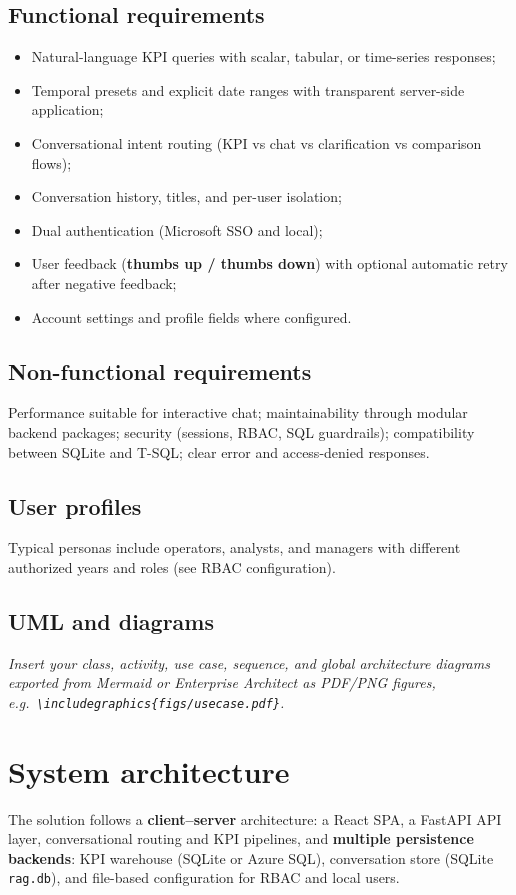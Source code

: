 \documentclass[12pt,a4paper,openany]{report}
\begin{document}
\subsection{Functional requirements}
\begin{itemize}[leftmargin=*]
  \item Natural-language KPI queries with scalar, tabular, or time-series responses;
  \item Temporal presets and explicit date ranges with transparent server-side application;
  \item Conversational intent routing (KPI vs chat vs clarification vs comparison flows);
  \item Conversation history, titles, and per-user isolation;
  \item Dual authentication (Microsoft SSO and local);
  \item User feedback (\textbf{thumbs up / thumbs down}) with optional automatic retry after negative feedback;
  \item Account settings and profile fields where configured.
\end{itemize}

\subsection{Non-functional requirements}
Performance suitable for interactive chat; maintainability through modular backend packages; security (sessions, RBAC, SQL guardrails); compatibility between SQLite and T-SQL; clear error and access-denied responses.

\subsection{User profiles}
Typical personas include operators, analysts, and managers with different authorized years and roles (see RBAC configuration).

\subsection{UML and diagrams}
\textit{Insert your class, activity, use case, sequence, and global architecture diagrams exported from Mermaid or Enterprise Architect as PDF/PNG figures, e.g.\ \texttt{\textbackslash includegraphics\{figs/usecase.pdf\}}.}

\section{System architecture}
The solution follows a \textbf{client--server} architecture: a React SPA, a FastAPI API layer, conversational routing and KPI pipelines, and \textbf{multiple persistence backends}: KPI warehouse (SQLite or Azure SQL), conversation store (SQLite \texttt{rag.db}), and file-based configuration for RBAC and local users.
\end{document}
